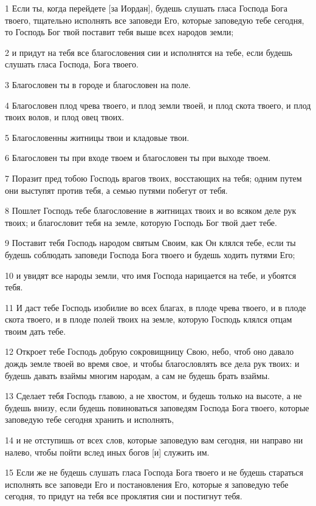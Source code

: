 \par 1 Если ты, когда перейдете [за Иордан], будешь слушать гласа Господа Бога твоего, тщательно исполнять все заповеди Его, которые заповедую тебе сегодня, то Господь Бог твой поставит тебя выше всех народов земли;
\par 2 и придут на тебя все благословения сии и исполнятся на тебе, если будешь слушать гласа Господа, Бога твоего.
\par 3 Благословен ты в городе и благословен на поле.
\par 4 Благословен плод чрева твоего, и плод земли твоей, и плод скота твоего, и плод твоих волов, и плод овец твоих.
\par 5 Благословенны житницы твои и кладовые твои.
\par 6 Благословен ты при входе твоем и благословен ты при выходе твоем.
\par 7 Поразит пред тобою Господь врагов твоих, восстающих на тебя; одним путем они выступят против тебя, а семью путями побегут от тебя.
\par 8 Пошлет Господь тебе благословение в житницах твоих и во всяком деле рук твоих; и благословит тебя на земле, которую Господь Бог твой дает тебе.
\par 9 Поставит тебя Господь народом святым Своим, как Он клялся тебе, если ты будешь соблюдать заповеди Господа Бога твоего и будешь ходить путями Его;
\par 10 и увидят все народы земли, что имя Господа нарицается на тебе, и убоятся тебя.
\par 11 И даст тебе Господь изобилие во всех благах, в плоде чрева твоего, и в плоде скота твоего, и в плоде полей твоих на земле, которую Господь клялся отцам твоим дать тебе.
\par 12 Откроет тебе Господь добрую сокровищницу Свою, небо, чтоб оно давало дождь земле твоей во время свое, и чтобы благословлять все дела рук твоих: и будешь давать взаймы многим народам, а сам не будешь брать взаймы.
\par 13 Сделает тебя Господь главою, а не хвостом, и будешь только на высоте, а не будешь внизу, если будешь повиноваться заповедям Господа Бога твоего, которые заповедую тебе сегодня хранить и исполнять,
\par 14 и не отступишь от всех слов, которые заповедую вам сегодня, ни направо ни налево, чтобы пойти вслед иных богов [и] служить им.
\par 15 Если же не будешь слушать гласа Господа Бога твоего и не будешь стараться исполнять все заповеди Его и постановления Его, которые я заповедую тебе сегодня, то придут на тебя все проклятия сии и постигнут тебя.
